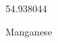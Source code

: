 \documentclass[12pt]{article}
\begin{document}
\hfill{}
\vfill
\begin{center}
  {\fontsize{50}{60}
  }

  \vspace{1em}

  54.938044

Manganese
\end{center}
\vfill
\end{document}
